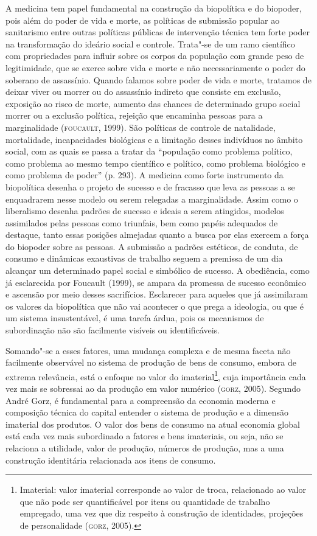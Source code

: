 A medicina tem papel fundamental na construção da biopolítica e do
biopoder, pois além do poder de vida e morte, as políticas de submissão
popular ao sanitarismo entre outras políticas públicas de intervenção
técnica tem forte poder na transformação do ideário social e controle.
Trata"-se de um ramo científico com propriedades para influir sobre os
corpos da população com grande peso de legitimidade, que se exerce sobre
vida e morte e não necessariamente o poder do soberano de assassínio.
Quando falamos sobre poder de vida e morte, tratamos de deixar viver ou
morrer ou do assassínio indireto que consiste em exclusão, exposição ao
risco de morte, aumento das chances de determinado grupo social morrer
ou a exclusão política, rejeição que encaminha pessoas para a
marginalidade (\textsc{foucault}, 1999). São políticas de controle de natalidade,
mortalidade, incapacidades biológicas e a limitação desses indivíduos no
âmbito social, com as quais se passa a tratar da ``população como
problema político, como problema ao mesmo tempo científico e político,
como problema biológico e como problema de poder'' (p. 293). A medicina como
forte instrumento da biopolítica desenha o projeto de sucesso e de
fracasso que leva as pessoas a se enquadrarem nesse modelo ou serem
relegadas a marginalidade. Assim como o liberalismo desenha padrões de
sucesso e ideais a serem atingidos, modelos assimilados pelas pessoas
como triunfais, bem como papéis adequados de destaque, tanto essas
posições almejadas quanto a busca por elas exercem a força do biopoder
sobre as pessoas. A submissão a padrões estéticos, de conduta, de
consumo e dinâmicas exaustivas de trabalho seguem a premissa de um dia
alcançar um determinado papel social e simbólico de sucesso. A
obediência, como já esclarecida por Foucault (1999), se ampara da promessa
de sucesso econômico e ascensão por meio desses sacrifícios. Esclarecer
para aqueles que já assimilaram os valores da biopolítica que não vai
acontecer o que prega a ideologia, ou que é um sistema insustentável, é
uma tarefa árdua, pois os mecanismos de subordinação não são facilmente
visíveis ou identificáveis.

Somando"-se a esses fatores, uma mudança complexa e de mesma faceta não
facilmente observável no sistema de produção de bens de consumo, embora
de extrema relevância, está o enfoque no valor do imaterial\footnote{Imaterial:
  valor imaterial corresponde ao valor de troca, relacionado ao valor
  que não pode ser quantificável por itens ou quantidade de trabalho
  empregado, uma vez que diz respeito à construção de identidades,
  projeções de personalidade (\textsc{gorz}, 2005).}, cuja importância cada vez
mais se sobressai ao da produção em valor numérico (\textsc{gorz}, 2005). Segundo
André Gorz, é fundamental para a compreensão da economia moderna e
composição técnica do capital entender o sistema de produção e a
dimensão imaterial dos produtos. O valor dos bens de consumo na atual
economia global está cada vez mais subordinado a fatores e bens
imateriais, ou seja, não se relaciona a utilidade, valor de produção,
números de produção, mas a uma construção identitária relacionada aos
itens de consumo.

